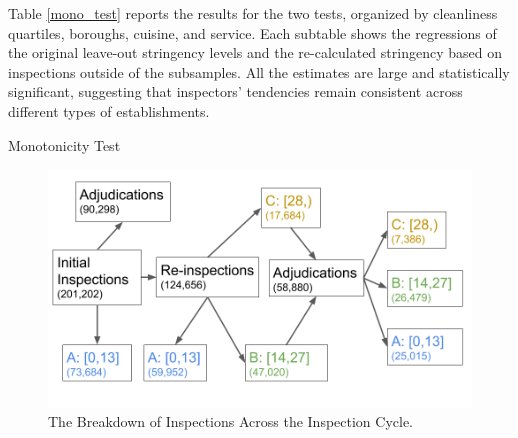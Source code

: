\documentclass[11pt]{article}
\begin{document}
Table \ref{mono_test} reports the results for the two tests, organized by cleanliness quartiles, boroughs, cuisine, and service. Each subtable shows the regressions of the original leave-out stringency levels and the re-calculated stringency based on inspections outside of the subsamples. All the estimates are large and statistically significant, suggesting that inspectors' tendencies remain consistent across different types of establishments. 

\begin{table}[h!]
\caption{Monotonicity Test}
\label{mono_test}

\subfloat[Boroughs]{\scalebox{0.6}{  }}

\subfloat[Cuisines]{\scalebox{0.6}{   }}

\subfloat[Service]{\scalebox{0.6}{   }}

\end{table}
\begin{figure}[h!]
\centering
\includegraphics[scale = 0.5]{Figures/Scores.png}
\caption{The Breakdown of Inspections Across the Inspection Cycle.}
\label{pipeline}
\end{figure}
\end{document}
